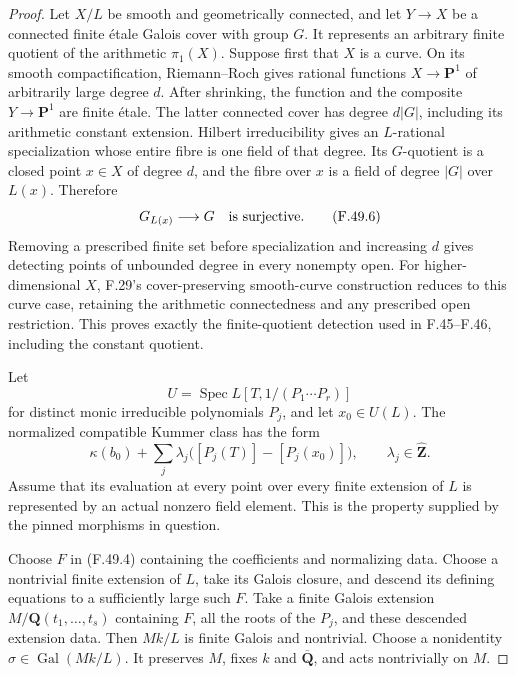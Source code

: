 \begin{proof}
Let \(X/L\) be smooth and geometrically connected, and let
\(Y\to X\) be a connected finite étale Galois cover with group \(G\).
It represents an arbitrary finite quotient of the arithmetic
\(\pi_1(X)\). Suppose first that \(X\) is a curve.
On its smooth compactification, Riemann--Roch gives rational
functions \(X\to\mathbf P^1\) of arbitrarily large degree \(d\).
After shrinking, the function and the composite
\(Y\to\mathbf P^1\) are finite étale. The latter connected cover
has degree \(d|G|\), including its arithmetic constant extension.
Hilbert irreducibility gives an \(L\)-rational specialization whose
entire fibre is one field of that degree. Its \(G\)-quotient is a
closed point \(x\in X\) of degree \(d\), and the fibre over \(x\)
is a field of degree \(|G|\) over \(L(x)\). Therefore
\[
                      G_{L(x)}\longrightarrow G
                      \quad\hbox{is surjective}.
 \tag{F.49.6}
\]
Removing a prescribed finite set before specialization and
increasing \(d\) gives detecting points of unbounded degree in
every nonempty open. For higher-dimensional \(X\), F.29's
cover-preserving smooth-curve construction reduces to this curve
case, retaining the arithmetic connectedness and any prescribed
open restriction. This proves exactly the finite-quotient
detection used in F.45--F.46, including the constant quotient.

Let
\[
 U=\operatorname{Spec}L[T,1/(P_1\cdots P_r)]
\]
for distinct monic irreducible polynomials \(P_j\), and let
\(x_0\in U(L)\). The normalized compatible Kummer class has the form
\[
 \kappa(b_0)+
   \sum_j\lambda_j\bigl([P_j(T)]-[P_j(x_0)]\bigr),
       \qquad\lambda_j\in\widehat{\mathbf Z}.
 \tag{F.49.7}
\]
Assume that its evaluation at every point over every finite extension
of \(L\) is represented by an actual nonzero field element.
This is the property supplied by the pinned morphisms in question.

Choose \(F\) in (F.49.4) containing the coefficients and normalizing
data. Choose a nontrivial finite extension of \(L\), take its
Galois closure, and descend its defining equations to a sufficiently
large such \(F\). Take a finite Galois extension
\(M/\mathbf Q(t_1,\ldots,t_s)\) containing \(F\), all the roots of
the \(P_j\), and these descended extension data.
Then \(Mk/L\) is finite Galois and nontrivial.
Choose a nonidentity
\(\sigma\in\operatorname{Gal}(Mk/L)\).
It preserves \(M\), fixes \(k\) and \(\overline{\mathbf Q}\),
and acts nontrivially on \(M\).


\end{proof}
